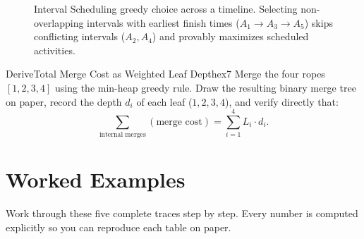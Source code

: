 \documentclass[11pt,a4paper]{article}
\theoremstyle{definition}
\begin{document}
\begin{figure}[htbp]
\caption{Interval Scheduling greedy choice across a timeline. Selecting non-overlapping intervals with earliest finish times ($A_1 \to A_3 \to A_5$) skips conflicting intervals ($A_2, A_4$) and provably maximizes scheduled activities.}
\label{fig:interval_scheduling}
\end{figure}

\begin{tryitbox}{Derive}{Total Merge Cost as Weighted Leaf Depth}{ex7}
Merge the four ropes $[1, 2, 3, 4]$ using the min-heap greedy rule. Draw the resulting binary merge tree on paper, record the depth $d_i$ of each leaf ($1, 2, 3, 4$), and verify directly that:
$$\sum_{\text{internal merges}} (\text{merge cost}) = \sum_{i=1}^{4} L_i \cdot d_i.$$
\end{tryitbox}

\section{Worked Examples}

Work through these five complete traces step by step. Every number is computed explicitly so you can reproduce each table on paper.
\end{document}
